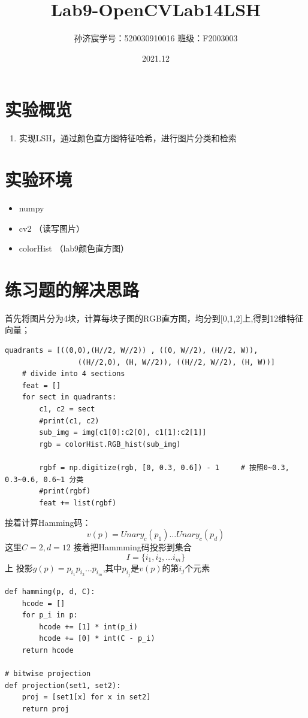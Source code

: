 \documentclass[12pt,a4paper]{article}
\title{Lab9-OpenCV}
\title{Lab14\quad LSH}
\date{2021.12}
\author{孙济宸\quad \quad 学号：520030910016 \quad  \quad 班级：F2003003}
\begin{document}
\maketitle
\section{实验概览}
\begin{enumerate}
\item 实现LSH，通过颜色直方图特征哈希，进行图片分类和检索
\end{enumerate}
\section{实验环境}
\begin{itemize}
	\item numpy
	\item cv2 （读写图片）
	\item colorHist （lab9颜色直方图）

\end{itemize}
\newpage

\section{练习题的解决思路}
首先将图片分为4块，计算每块子图的RGB直方图，均分到[0,1,2]上,得到12维特征向量；
\begin{lstlisting}[style=py]
	quadrants = [((0,0),(H//2, W//2)) , ((0, W//2), (H//2, W)),
                 ((H//2,0), (H, W//2)), ((H//2, W//2), (H, W))]    
    # divide into 4 sections
    feat = []
    for sect in quadrants:
        c1, c2 = sect
        #print(c1, c2)
        sub_img = img[c1[0]:c2[0], c1[1]:c2[1]] 
        rgb = colorHist.RGB_hist(sub_img)
        
        rgbf = np.digitize(rgb, [0, 0.3, 0.6]) - 1     # 按照0~0.3, 0.3~0.6, 0.6~1 分类
        #print(rgbf)
        feat += list(rgbf)
\end{lstlisting}

接着计算Hamming码：
$$v(p)=Unary_c({p_1}) \dots Unary_c({p_d})$$
这里$C = 2, d = 12$
接着把Hammming码投影到集合
$$I = \{i_1, i_2, \dots i_m \}$$上
投影$g(p)=p_{i_1}p_{i_2}\dots p_{i_m}$,其中$p_{i_j}$是$v(p)$的第${i_j}$个元素
\begin{lstlisting}[style=py]
def hamming(p, d, C):
    hcode = []
    for p_i in p:
        hcode += [1] * int(p_i)
        hcode += [0] * int(C - p_i)
    return hcode

# bitwise projection 
def projection(set1, set2): 
    proj = [set1[x] for x in set2]
    return proj
\end{lstlisting}
\end{document}

